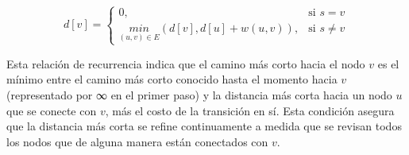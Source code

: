 \[
d[v] = 
\begin{cases}
0, & \text{si } s = v \\
\underset{(u, v) \in E}{min}(d[v], d[u] + w(u, v)), & \text{si } s \neq v
\end{cases}
\]

Esta relación de recurrencia indica que el camino más corto hacia el nodo \(v\) es el mínimo entre el camino más corto conocido hasta el momento hacia \(v\) (representado por ∞ en el primer paso) y la distancia más corta hacia un nodo \(u\) que se conecte con \(v\), más el costo de la transición en sí. Esta condición asegura que la distancia más corta se refine continuamente a medida que se revisan todos los nodos que de alguna manera están conectados con \(v\).